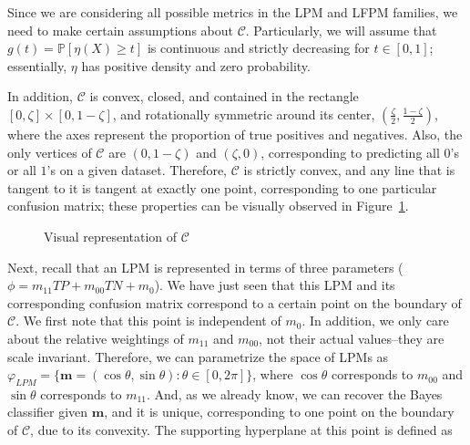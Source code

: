 \documentclass[
  letterpaper,
  numbers=noenddot,
  DIV=11,
  oneside]{scrreprt}
\theoremstyle{remark}
\begin{document}
Since we are considering all possible metrics in the LPM and LFPM
families, we need to make certain assumptions about \(\mathcal{C}\).
Particularly, we will assume that \(g(t) = \mathbb{P}[\eta(X) \geq t]\)
is continuous and strictly decreasing for \(t \in [0, 1]\); essentially,
\(\eta\) has positive density and zero probability.

In addition, \(\mathcal{C}\) is convex, closed, and contained in the
rectangle \([0, \zeta] \times[0,1-\zeta]\), and rotationally symmetric
around its center, \((\frac{\zeta}{2}, \frac{1-\zeta}{2})\), where the
axes represent the proportion of true positives and negatives. Also, the
only vertices of \(\mathcal{C}\) are \((0,1-\zeta)\) and \((\zeta, 0)\),
corresponding to predicting all \(0\)'s or all \(1\)'s on a given
dataset. Therefore, \(\mathcal{C}\) is strictly convex, and any line
that is tangent to it is tangent at exactly one point, corresponding to
one particular confusion matrix; these properties can be visually
observed in Figure~\ref{fig-c}.

\begin{figure}


\caption{\label{fig-c}Visual representation of \(\mathcal{C}\)}

\end{figure}%

Next, recall that an LPM is represented in terms of three parameters
(\(\phi = m_{11}TP + m_{00}TN + m_0\)). We have just seen that this LPM
and its corresponding confusion matrix correspond to a certain point on
the boundary of \(\mathcal{C}\). We first note that this point is
independent of \(m_0\). In addition, we only care about the relative
weightings of \(m_{11}\) and \(m_{00}\), not their actual values--they
are scale invariant. Therefore, we can parametrize the space of LPMs as
\(\varphi_{L P M}=\{\mathbf{m}=(\cos \theta, \sin \theta): \theta \in[0,2 \pi]\}\),
where \(\cos \theta\) corresponds to \(m_{00}\) and \(\sin \theta\)
corresponds to \(m_{11}\). And, as we already know, we can recover the
Bayes classifier given \(\mathbf{m}\), and it is unique, corresponding
to one point on the boundary of \(\mathcal{C}\), due to its convexity.
The supporting hyperplane at this point is defined as
\end{document}
